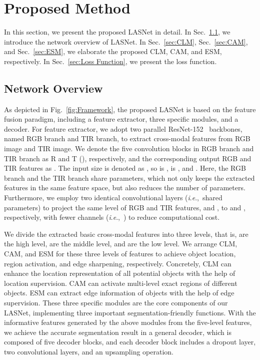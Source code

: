 \documentclass[journal]{IEEEtran}
\newcommand{\ie}{\textit{i}.\textit{e}.,~}
\begin{document}
\section{Proposed Method}
\label{sec:OurMethod}
In this section, we present the proposed LASNet in detail.
In Sec.~\ref{sec:Overview}, we introduce the network overview of LASNet.
In Sec.~\ref{sec:CLM}, Sec.~\ref{sec:CAM}, and Sec.~\ref{sec:ESM}, we elaborate the proposed CLM, CAM, and ESM, respectively.
In Sec.~\ref{sec:Loss Function}, we present the loss function.




\subsection{Network Overview}
\label{sec:Overview}
As depicted in Fig.~\ref{fig:Framework}, the proposed LASNet is based on the feature fusion paradigm, including a feature extractor, three specific modules, and a decoder.
For feature extractor, we adopt two parallel ResNet-152~\cite{2016ResNet} backbones, named RGB branch and TIR branch, to extract cross-modal features from RGB image and TIR image.
We denote the five convolution blocks in RGB branch and TIR branch as R and T (), respectively, and the corresponding output RGB and TIR features as .
The input size is denoted as , so  is ,  is , and .
Here, the RGB branch and the TIR branch share parameters, which not only keeps the extracted features in the same feature space, but also reduces the number of parameters.
Furthermore, we employ two identical convolutional layers (\ie shared parameters) to project the same level of RGB and TIR features,  and , to  and , respectively, with fewer channels (\ie ) to reduce computational cost.

We divide the extracted basic cross-modal features into three levels, that is,  are the high level,  are the middle level, and  are the low level.
We arrange CLM, CAM, and ESM for these three levels of features to achieve object location, region activation, and edge sharpening, respectively.
Concretely, CLM can enhance the location representation of all potential objects with the help of location supervision.
CAM can activate multi-level exact regions of different objects.
ESM can extract edge information of objects with the help of edge supervision.
These three specific modules are the core components of our LASNet, implementing three important segmentation-friendly functions.
With the informative features generated by the above modules from the five-level features, we achieve the accurate segmentation result  in a general decoder, which is composed of five decoder blocks, and each decoder block includes a dropout layer, two convolutional layers, and an upsampling operation.
\end{document}
